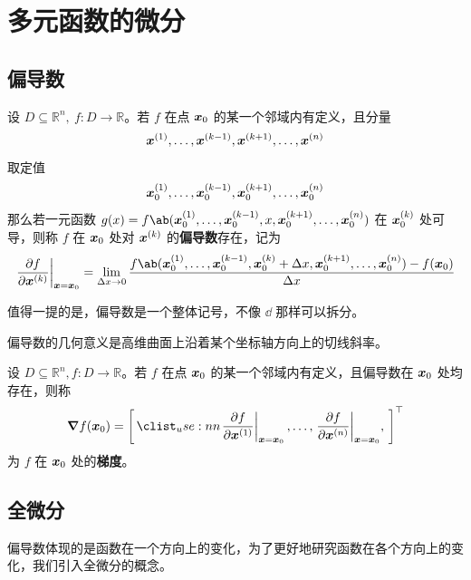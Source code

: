 \section{多元函数的微分}

\subsection{偏导数}

\begin{definition}[偏导数]
    设 $D \subseteq \mathbb{R}^{n},\ f: D \to \mathbb{R}$。若 $f$ 在点 $\boldsymbol{x}_0$ 的某一个邻域内有定义，且分量
    $$
    \boldsymbol{x}^{(1)}, \dots, \boldsymbol{x}^{(k - 1)}, \boldsymbol{x}^{(k + 1)},\dots, \boldsymbol{x}^{(n)}
    $$
    取定值
    $$
    \boldsymbol{x}^{(1)}_0, \dots, \boldsymbol{x}^{(k - 1)}_0, \boldsymbol{x}^{(k + 1)}_0,\dots, \boldsymbol{x}^{(n)}_0
    $$
    那么若一元函数 $g(x) = f\ab(\vect{x}^{(1)}_0, \dots, \vect{x}^{(k - 1)}_0, x, \vect{x}^{(k + 1)}_0,\dots, \vect{x}^{(n)}_0)$ 在 $\boldsymbol{x}_0^{(k)}$ 处可导，则称 $f$ 在 $\boldsymbol{x}_0$ 处对 $\boldsymbol{x}^{(k)}$ 的\textbf{偏导数}存在，记为
    $$
    \left. \pdv{f}{\vect{x}^{(k)}} \right|_{\vect{x} = \vect{x}_0} = \lim_{\Delta x \to 0} \frac{f\ab(\vect{x}^{(1)}_0, \dots, \vect{x}^{(k - 1)}_0, \vect{x}^{(k)}_0 + \Delta x, \vect{x}^{(k + 1)}_0, \dots, \vect{x}^{(n)}_0) - f(\vect{x}_0)}{\Delta x}
    $$
\end{definition}

\begin{remark}
    值得一提的是，偏导数是一个整体记号，不像 $\dd$ 那样可以拆分。
\end{remark}

偏导数的几何意义是高维曲面上沿着某个坐标轴方向上的切线斜率。

\begin{definition}[梯度]
    设 $D \subseteq \mathbb{R}^n, f: D \to \mathbb{R}$。若 $f$ 在点 $\boldsymbol{x}_0$ 的某一个邻域内有定义，且偏导数在 $\boldsymbol{x}_0$ 处均存在，则称
    $$
    \grad{f}(\vect{x}_0) = \rvec{\left. \pdv{f}{\vect{x}^{(1)}} \right|_{\vect{x} = \vect{x}_0}, \dots, \left. \pdv{f}{\vect{x}^{(n)}} \right|_{\vect{x} = \vect{x}_0}}^\top
    $$
    为 $f$ 在 $\boldsymbol{x}_0$ 处的\textbf{梯度}。
\end{definition}

\subsection{全微分}

偏导数体现的是函数在一个方向上的变化，为了更好地研究函数在各个方向上的变化，我们引入全微分的概念。

